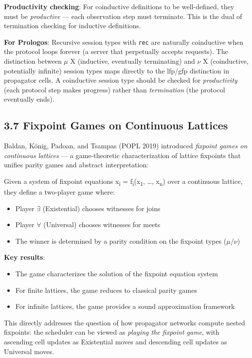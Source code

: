 \documentclass[11pt]{article}
\begin{document}
\textbf{Productivity checking}: For coinductive definitions to be well-defined, they
must be \emph{productive} --- each observation step must terminate. This is the
dual of termination checking for inductive definitions.

\textbf{For Prologos}: Recursive session types with \texttt{rec} are naturally coinductive
when the protocol loops forever (a server that perpetually accepts requests).
The distinction between \(\mu\) X (inductive, eventually terminating) and \(\nu\) X
(coinductive, potentially infinite) session types maps directly to the
lfp/gfp distinction in propagator cells. A coinductive session type should be
checked for \emph{productivity} (each protocol step makes progress) rather than
\emph{termination} (the protocol eventually ends).
\subsection{3.7 Fixpoint Games on Continuous Lattices}
\label{sec:org18005ff}

Baldan, König, Padoan, and Tsampas (POPL 2019) introduced \emph{fixpoint games on
continuous lattices} --- a game-theoretic characterization of lattice fixpoints
that unifies parity games and abstract interpretation:

Given a system of fixpoint equations x\textsubscript{i} = f\textsubscript{i}(x\textsubscript{1}, \ldots{}, x\textsubscript{n}) over a
continuous lattice, they define a two-player game where:
\begin{itemize}
\item Player \(\exists\) (Existential) chooses witnesses for joins
\item Player \(\forall\) (Universal) chooses witnesses for meets
\item The winner is determined by a parity condition on the fixpoint types (\(\mu\)/\(\nu\))
\end{itemize}

\textbf{Key results}:
\begin{itemize}
\item The game characterizes the solution of the fixpoint equation system
\item For finite lattices, the game reduces to classical parity games
\item For infinite lattices, the game provides a sound approximation framework
\end{itemize}

This directly addresses the question of how propagator networks compute
nested fixpoints: the scheduler can be viewed as \emph{playing the fixpoint game},
with ascending cell updates as Existential moves and descending cell updates
as Universal moves.
\end{document}
